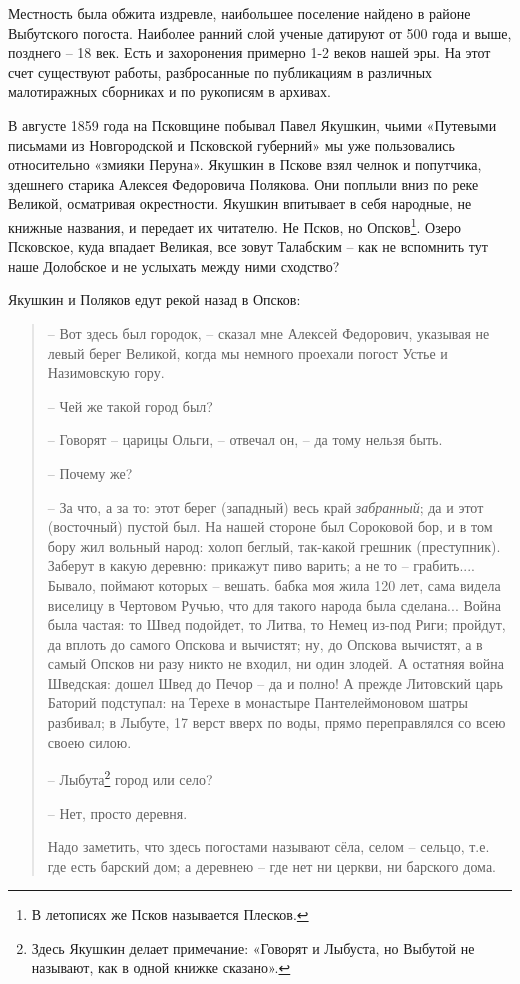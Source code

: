 Местность была обжита издревле, наибольшее поселение найдено в районе Выбутского погоста. Наиболее ранний слой ученые датируют от 500 года и выше, позднего – 18 век. Есть и захоронения примерно 1-2 веков нашей эры. На этот счет существуют работы, разбросанные по публикациям в различных малотиражных сборниках и по рукописям в архивах.

В августе 1859 года на Псковщине побывал Павел Якушкин, чьими «Путевыми письмами из Новгородской и Псковской губерний»\cite{yakushin01} мы уже пользовались относительно «змияки Перуна». Якушкин в Пскове взял челнок и попутчика, здешнего старика Алексея Федоровича Полякова. Они поплыли вниз по реке Великой, осматривая окрестности. Якушкин впитывает в себя народные, не книжные названия, и передает их читателю. Не Псков, но Опсков\footnote{В летописях же Псков называется Плесков.}. Озеро Псковское, куда впадает Великая, все зовут Талабским – как не вспомнить тут наше Долобское и не услыхать между ними сходство?

Якушкин и Поляков едут рекой назад в Опсков:

\begin{quotation}
 – Вот здесь был городок, – сказал мне Алексей Федорович, указывая не левый берег Великой, когда мы немного проехали погост Устье и Назимовскую гору.

   – Чей же такой город был?

   – Говорят – царицы Ольги, – отвечал он, – да тому нельзя быть.

   – Почему же?

   – За что, а за то: этот берег (западный) весь край \textit{забранный}; да и этот (восточный) пустой был. На нашей стороне был Сороковой бор, и в том бору жил вольный народ: холоп беглый, так-какой грешник (преступник). Заберут в какую деревню: прикажут пиво варить; а не то – грабить.... Бывало, поймают которых – вешать. бабка моя жила 120 лет, сама видела виселицу в Чертовом Ручью, что для такого народа была сделана... Война была частая: то Швед подойдет, то Литва, то Немец из-под Риги; пройдут, да вплоть до самого Опскова и вычистят; ну, до Опскова вычистят, а в самый Опсков ни разу никто не входил, ни один злодей. А остатняя война Шведская: дошел Швед до Печор – да и полно! А прежде Литовский царь Баторий подступал: на Терехе в монастыре Пантелеймоновом шатры разбивал; в Лыбуте, 17 верст вверх по воды, прямо переправлялся со всею своею силою.

   – Лыбута\footnote{Здесь Якушкин делает примечание: «Говорят и Лыбуста, но Выбутой не называют, как в одной книжке сказано».} город или село?

   – Нет, просто деревня.

Надо заметить, что здесь погостами называют сёла, селом – сельцо, т.е. где есть барский дом; а деревнею – где нет ни церкви, ни барского дома.
\end{quotation}

